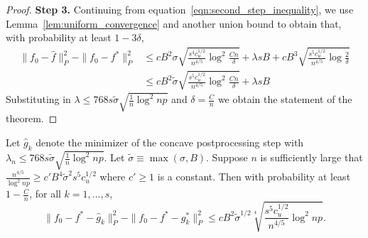 \begin{proof}
\textbf{Step 3.} Continuing from
equation~\eqref{eqn:second_step_inequality}, we use
Lemma~\ref{lem:uniform_convergence} and another union bound to obtain
that, with probability at least $1-3\delta$,
\begin{align}
\|f_0 - \hat{f} \|_P^2 - \| f_0 - f^* \|_P^2 
   &\leq cB^2 \sigma 
    \sqrt{ \frac{s^4c_u^{1/2}}{n^{4/5}} \log^2 \frac{Cn}{\delta}}
 +\lambda s B + c B^3 \sqrt{ \frac{s^5c_u^{1/2}}{n^{4/5}} \log \frac{2}{\delta}}
    \nonumber \\
&\leq c B^2 \tilde{\sigma} \sqrt{ \frac{s^5c_u^{1/2}}{n^{4/5}} \log^2 \frac{Cn}{\delta}} + \lambda sB \nonumber
\end{align}
Substituting in $\lambda \leq 768 s \tilde{\sigma} \sqrt{\frac{1}{n}
  \log^2 np}$ and $\delta = \frac{C}{n}$ we obtain the statement of
the theorem.
\end{proof}
 






\begin{theorem}
\label{thm:concave_consistent}
Let $\hat{g}_k$ denote the minimizer of the concave postprocessing
step with $\lambda_n \leq 768 s\tilde{\sigma} \sqrt{\frac{1}{n} \log^2 np}$. Let $\tilde{\sigma} \equiv \max(\sigma, B)$.
Suppose $n$ is sufficiently large that $\frac{n^{4/5}}{\log^2 np} \geq c' B^4 \tilde{\sigma}^2 s^5 c_u^{1/2}$ where $c' \geq 1$ is a constant.
Then with probability at least $1- \frac{C}{n}$, for all $k=1,...,s$,
\[
\| f_0 - f^* - \hat{g}_k \|_P^2 - \| f_0 - f^* - g^*_k \|_P^2 \leq  c B^2 \tilde{\sigma}^{1/2} \sqrt[4]{ \frac{s^5c_u^{1/2}}{n^{4/5}} \log^2 np}.
\]
\end{theorem}

